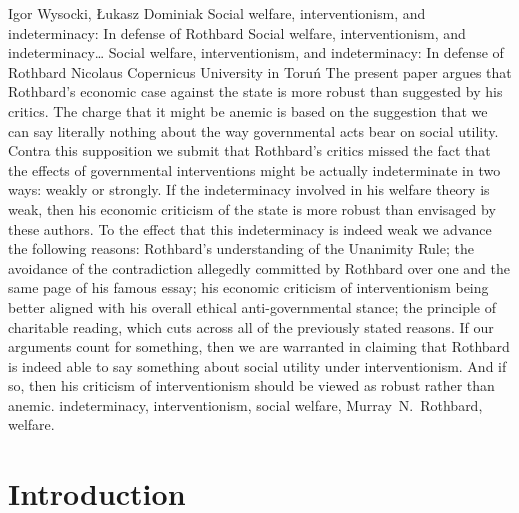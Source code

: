 \begin{artengenv}{Igor Wysocki, Łukasz Dominiak}
	{Social welfare, interventionism, and indeterminacy: In defense of Rothbard}
	{Social welfare, interventionism, and indeterminacy\ldots}
	{Social welfare, interventionism, and indeterminacy: In defense of Rothbard}
	{Nicolaus Copernicus University in Toruń}
	{The present paper argues that Rothbard's economic case against the state is more robust than suggested by his critics. The charge that it might be anemic is based on the suggestion that we can say literally nothing about the way governmental acts bear on social utility. Contra this supposition we submit that Rothbard's critics missed the fact that the effects of governmental interventions might be actually indeterminate in two ways: weakly or strongly. If the indeterminacy involved in his welfare theory is weak, then his economic criticism of the state is more robust than envisaged by these authors. To the effect that this indeterminacy is indeed weak we advance the following reasons: Rothbard's understanding of the Unanimity Rule; the avoidance of the contradiction allegedly committed by Rothbard over one and the same page of his famous essay; his economic criticism of interventionism being better aligned with his overall ethical anti-governmental stance; the principle of charitable reading, which cuts across all of the previously stated reasons. If our arguments count for something, then we are warranted in claiming that Rothbard is indeed able to say something about social utility under interventionism. And if so, then his criticism of interventionism should be viewed as robust rather than anemic.
	}
	{indeterminacy, interventionism, social welfare, Murray~N.~Rothbard, welfare.}



\section{Introduction}


\end{artengenv}
